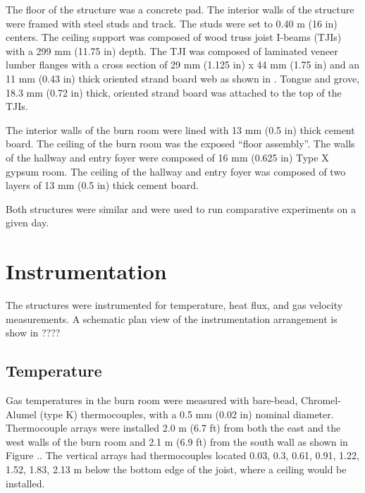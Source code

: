 \documentclass[12pt,oneside]{book}
\begin{document}
	The floor of the structure was a concrete pad.  The interior walls of the structure were framed with steel studs and track.  The studs were set to 0.40 m (16 in) centers.  The ceiling support was composed of wood truss joist I-beams (TJIs) with a 299 mm (11.75 in) depth.  The TJI was composed of laminated veneer lumber flanges with a cross section of 29 mm (1.125 in) x 44 mm (1.75 in) and an 11 mm (0.43 in) thick oriented strand board web as shown in .  Tongue and grove, 18.3 mm (0.72 in) thick, oriented strand board was attached to the top of the TJIs.     
	
	The interior walls of the burn room were lined with 13 mm (0.5 in) thick cement board.  The ceiling of the burn room was the exposed “floor assembly”.  The walls of the hallway and entry foyer were composed of 16 mm (0.625 in) Type X gypsum room. The ceiling of the hallway and entry foyer was composed of two layers of 13 mm (0.5 in) thick cement board.    
	
	Both structures were similar and were used to run comparative experiments on a given day.
	
	\section{Instrumentation}
	\label{sec:Instrumentation}
	
	The structures were instrumented for temperature, heat flux, and gas velocity measurements.  A schematic plan view of the instrumentation arrangement is show in ????  
	
	\subsection{Temperature}
	\label{subsec:Temperature}
	
	Gas temperatures in the burn room were measured with bare-bead, Chromel-Alumel (type K) thermocouples, with a 0.5 mm (0.02 in) nominal diameter.  Thermocouple arrays were installed 2.0 m (6.7 ft) from both the east and the west walls of the burn room and 2.1 m (6.9 ft) from the south wall as shown in Figure ..  The vertical arrays had thermocouples located 0.03, 0.3, 0.61, 0.91, 1.22, 1.52, 1.83, 2.13 m below the bottom edge of the joist, where a ceiling would be installed.   
	
\end{document}
